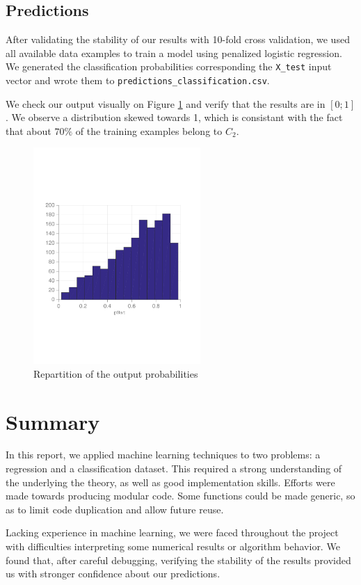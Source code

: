\documentclass{article} %
\begin{document}
  \subsection{Predictions}
  After validating the stability of our results with 10-fold cross validation, we used all available data examples to train a model using penalized logistic regression. We generated the classification probabilities corresponding the \texttt{X\_test} input vector and wrote them to \texttt{predictions\_classification.csv}.

  We check our output visually on Figure \ref{fig:classification-output} and verify that the results are in $[0; 1]$. We observe a distribution skewed towards 1, which is consistant with the fact that about $70\%$ of the training examples belong to $C_2$.

  \begin{figure}[ht]
    \center
    \includegraphics[width=2.5in]{figures/classification/output-phat.pdf}
    \caption{Repartition of the output probabilities}
    \label{fig:classification-output}
  \end{figure}

\section{Summary}
In this report, we applied machine learning techniques to two problems: a regression and a classification dataset. This required a strong understanding of the underlying the theory, as well as good implementation skills. Efforts were made towards producing modular code. Some functions could be made generic, so as to limit code duplication and allow future reuse.

Lacking experience in machine learning, we were faced throughout the project with difficulties interpreting some numerical results or algorithm behavior. We found that, after careful debugging, verifying the stability of the results provided us with stronger confidence about our predictions.
\end{document}

